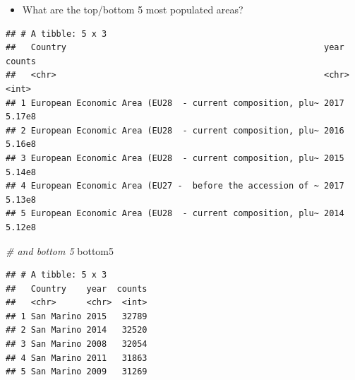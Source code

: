 \documentclass[]{book}
\newenvironment{Shaded}{\begin{snugshade}}{\end{snugshade}}
\newcommand{\KeywordTok}[1]{\textcolor[rgb]{0.13,0.29,0.53}{\textbf{#1}}}
\newcommand{\DecValTok}[1]{\textcolor[rgb]{0.00,0.00,0.81}{#1}}
\newcommand{\StringTok}[1]{\textcolor[rgb]{0.31,0.60,0.02}{#1}}
\newcommand{\CommentTok}[1]{\textcolor[rgb]{0.56,0.35,0.01}{\textit{#1}}}
\newcommand{\OperatorTok}[1]{\textcolor[rgb]{0.81,0.36,0.00}{\textbf{#1}}}
\newcommand{\NormalTok}[1]{#1}
\providecommand{\tightlist}{%
  \setlength{\itemsep}{0pt}\setlength{\parskip}{0pt}}
\theoremstyle{definition}
\theoremstyle{definition}
\theoremstyle{definition}
\theoremstyle{remark}
\begin{document}
\begin{itemize}
\tightlist
\item
  What are the top/bottom 5 most populated areas?
\end{itemize}

\begin{Shaded}
\end{Shaded}

\begin{verbatim}
## # A tibble: 5 x 3
##   Country                                                   year    counts
##   <chr>                                                     <chr>    <int>
## 1 European Economic Area (EU28  - current composition, plu~ 2017    5.17e8
## 2 European Economic Area (EU28  - current composition, plu~ 2016    5.16e8
## 3 European Economic Area (EU28  - current composition, plu~ 2015    5.14e8
## 4 European Economic Area (EU27 -  before the accession of ~ 2017    5.13e8
## 5 European Economic Area (EU28  - current composition, plu~ 2014    5.12e8
\end{verbatim}

\begin{Shaded}
\begin{Highlighting}[]
\CommentTok{# and bottom 5}
\NormalTok{bottom5}
\end{Highlighting}
\end{Shaded}

\begin{verbatim}
## # A tibble: 5 x 3
##   Country    year  counts
##   <chr>      <chr>  <int>
## 1 San Marino 2015   32789
## 2 San Marino 2014   32520
## 3 San Marino 2008   32054
## 4 San Marino 2011   31863
## 5 San Marino 2009   31269
\end{verbatim}
\end{document}
